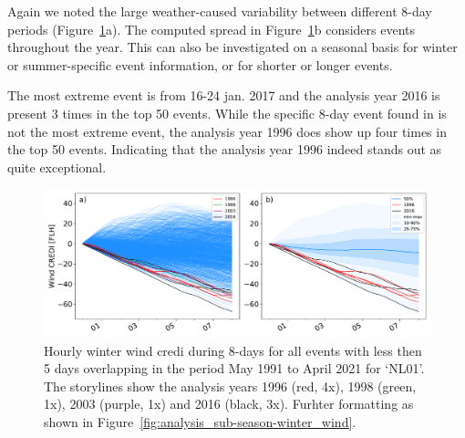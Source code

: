 \documentclass[12pt]{iopart}
\newcommand{\wdi}[0]{{\sc wind credi}}
\begin{document}
Again we noted the large weather-caused variability between different 8-day periods (Figure~\ref{fig:analysis_short-term-winter_wind}a). 
The computed spread in Figure~\ref{fig:analysis_short-term-winter_wind}b considers events throughout the year. 
This can also be investigated on a seasonal basis for winter or summer-specific event information, or for shorter or longer events.  

The most extreme event is from 16-24 jan. 2017 and the analysis year 2016 is present 3 times in the top 50 events. 
While the specific 8-day event found in \textcite{tennet2023} is not the most extreme event, the analysis year 1996 does show up four times in the top 50 events. 
Indicating that the analysis year 1996 indeed stands out as quite exceptional.

\begin{figure}[t]
        \centering
        \includegraphics[width=\textwidth]{Figures/WindCREDI_shortterm}
        \caption{
                Hourly winter \wdi{} during 8-days for all events with less then 5 days overlapping in the period May 1991 to April 2021 for `NL01'. 
                The storylines show the analysis years 1996 (red, 4x), 1998 (green, 1x), 2003 (purple, 1x) and 2016 (black, 3x). 
                Furhter formatting as shown in Figure~\ref{fig:analysis_sub-season-winter_wind}.
        }
        \label{fig:analysis_short-term-winter_wind}
\end{figure}








\end{document}

